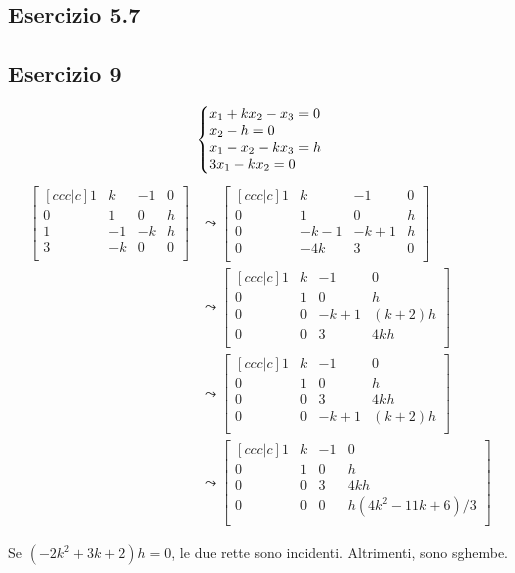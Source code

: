 \documentclass{article}
\makeatletter
\newcommand*{\sys}[1]{\left\{\begin{array}{@{}l@{}}#1\end{array}\right.}
\newcommand*{\m}[1]{\begin{bmatrix}#1\end{bmatrix}}
\makeatother
\begin{document}
\subsection*{Esercizio 5.7}

\pagebreak
\subsection*{Esercizio 9}
\[\sys{
    x_1 + kx_2 - x_3 = 0\\
    x_2 - h = 0\\
    x_1 - x_2 - kx_3 = h\\
    3x_1 - kx_2 = 0\\
}\]
\[\begin{aligned}
\m{[ccc|c]
    1 & k & -1 & 0 \\
    0 & 1 & 0 & h \\
    1 & -1 & -k & h \\
    3 & -k & 0 & 0 \\
}&\leadsto\m{[ccc|c]
    1 & k & -1 & 0 \\
    0 & 1 & 0 & h \\
    0 & -k-1 & -k+1 & h \\
    0 & -4k & 3 & 0 \\
}\\&\leadsto\m{[ccc|c]
    1 & k & -1 & 0 \\
    0 & 1 & 0 & h \\
    0 & 0 & -k+1 & (k+2)h \\
    0 & 0 & 3 & 4kh \\
}\\&\leadsto\m{[ccc|c]
    1 & k & -1 & 0 \\
    0 & 1 & 0 & h \\
    0 & 0 & 3 & 4kh \\
    0 & 0 & -k+1 & (k+2)h \\
}\\&\leadsto\m{[ccc|c]
    1 & k & -1 & 0 \\
    0 & 1 & 0 & h \\
    0 & 0 & 3 & 4kh \\
    0 & 0 & 0 & h(4k^2-11k+6)/3 \\
}
\end{aligned}\]

Se $(-2k^2+3k+2)h = 0$, le due rette sono incidenti.
Altrimenti, sono sghembe.
\end{document}
